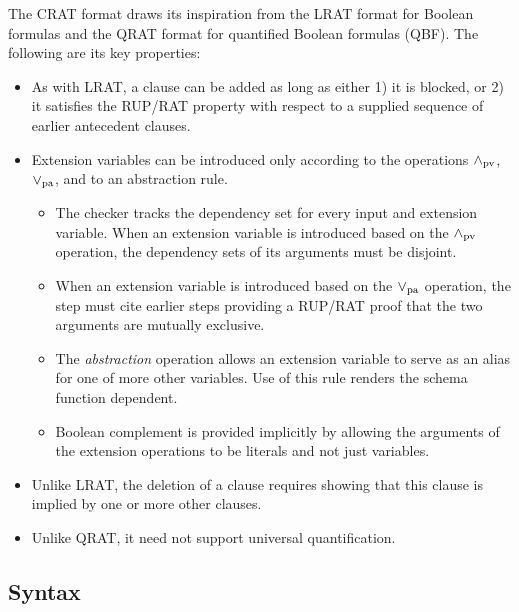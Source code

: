 \documentclass{llncs}
\newcommand{\pand}{\mathbin{\land_{\rm pv}}}
\newcommand{\por}{\mathbin{\lor_{\rm pa}}}
\begin{document}
The CRAT format draws its inspiration from the LRAT format for Boolean formulas and the
QRAT format for
quantified Boolean formulas (QBF).  The following are its key properties:
\begin{itemize}
\item As with LRAT, a clause can be added as long as either 1) it is
  blocked, or 2) it satisfies the RUP/RAT property with respect to a supplied sequence
  of earlier antecedent clauses.
\item  Extension variables can be introduced only according to the operations $\pand$, $\por$, and to an abstraction rule.
\begin{itemize}
\item The checker tracks the dependency set for every input and
  extension variable.  When an extension variable is introduced based
  on the $\pand$ operation, the dependency sets of its arguments must
  be disjoint.
\item When an extension variable is introduced based on the $\por$
  operation, the step must cite earlier steps providing a RUP/RAT proof
  that the two arguments are mutually exclusive.
\item The {\em abstraction} operation allows an extension
  variable to serve as an alias for one of more other 
  variables.  Use of this rule renders the schema function dependent.
\item Boolean complement is provided implicitly by allowing the
  arguments of the extension operations to be literals and not just
  variables.
\end{itemize}
\item Unlike LRAT, the deletion of a clause requires showing that this clause is implied by one or more other clauses.
\item Unlike QRAT, it need not support universal quantification.
\end{itemize}

\subsection{Syntax}
\end{document}
